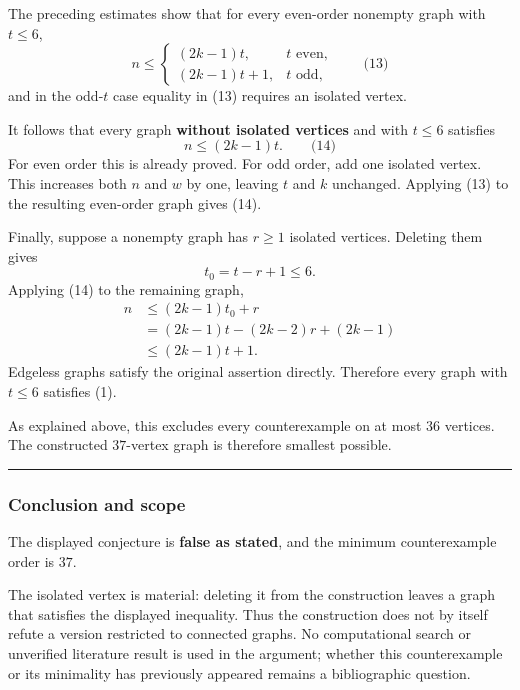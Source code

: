 \documentclass[
  11pt,
  a4paper,
]{article}
\newcounter{none} %
\begin{document}
The preceding estimates show that for every even-order nonempty graph
with \(t\le6\), \[
n\le
\begin{cases}
(2k-1)t,&t\text{ even},\\
(2k-1)t+1,&t\text{ odd},
\end{cases} \qquad\text{(13)}
\] and in the odd-\(t\) case equality in (13) requires an isolated
vertex.

It follows that every graph \textbf{without isolated vertices} and with
\(t\le6\) satisfies \[
n\le(2k-1)t. \qquad\text{(14)}
\] For even order this is already proved. For odd order, add one
isolated vertex. This increases both \(n\) and \(w\) by one, leaving
\(t\) and \(k\) unchanged. Applying (13) to the resulting even-order
graph gives (14).

Finally, suppose a nonempty graph has \(r\ge1\) isolated vertices.
Deleting them gives \[
t_0=t-r+1\le6.
\] Applying (14) to the remaining graph, \begin{equation*}
\begin{aligned}
n
&\le (2k-1)t_0+r\\
&=(2k-1)t-(2k-2)r+(2k-1)\\
&\le(2k-1)t+1.
\end{aligned}
\end{equation*} Edgeless graphs satisfy the original assertion directly.
Therefore every graph with \(t\le6\) satisfies (1).

As explained above, this excludes every counterexample on at most \(36\)
vertices. The constructed \(37\)-vertex graph is therefore smallest
possible.

\begin{center}\rule{0.5\linewidth}{0.5pt}\end{center}

\subsubsection{Conclusion and scope}\label{conclusion-and-scope}

The displayed conjecture is \textbf{false as stated}, and the minimum
counterexample order is \(37\).

The isolated vertex is material: deleting it from the construction
leaves a graph that satisfies the displayed inequality. Thus the
construction does not by itself refute a version restricted to connected
graphs. No computational search or unverified literature result is used
in the argument; whether this counterexample or its minimality has
previously appeared remains a bibliographic question.
\end{document}
